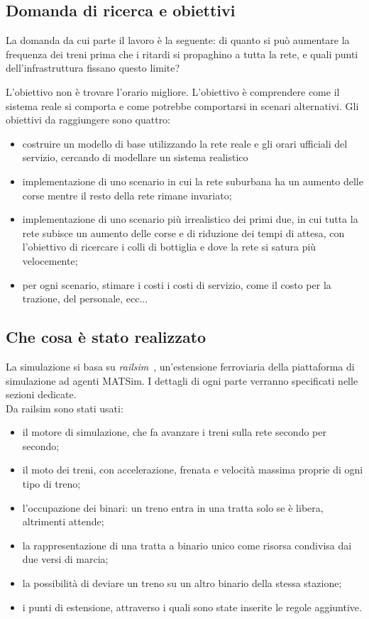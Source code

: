 \subsection{Domanda di ricerca e obiettivi}
La domanda da cui parte il lavoro è la seguente: di quanto si può aumentare la frequenza dei treni prima che i ritardi si propaghino a tutta la rete, e quali punti dell'infrastruttura fissano questo limite?

L'obiettivo non è trovare l'orario migliore.
L'obiettivo è comprendere come il sistema reale si comporta e come potrebbe comportarsi in scenari alternativi.
Gli obiettivi da raggiungere sono quattro:
\begin{itemize}
	\item costruire un modello di base utilizzando la rete reale e gli orari ufficiali del servizio, cercando di modellare un sistema realistico
	\item implementazione di uno scenario in cui la rete suburbana ha un aumento delle corse mentre il resto della rete rimane invariato;
	\item implementazione di uno scenario più irrealistico dei primi due, in cui tutta la rete subisce un aumento delle corse e di riduzione dei tempi di attesa, con l'obiettivo di ricercare i colli di bottiglia e dove la rete si satura più velocemente;
	\item per ogni scenario, stimare i costi i costi di servizio, come il costo per la trazione, del personale, ecc...
\end{itemize}

\subsection{Che cosa è stato realizzato}

La simulazione si basa su \textit{railsim}~\cite{kaddoura2024railsim}, un'estensione ferroviaria della piattaforma di simulazione ad agenti MATSim. I dettagli di ogni parte verranno specificati nelle sezioni dedicate.\\

Da railsim sono stati usati:
\begin{itemize}
	\item il motore di simulazione, che fa avanzare i treni sulla rete secondo per secondo;
	\item il moto dei treni, con accelerazione, frenata e velocità massima proprie di ogni tipo di treno;
	\item l'occupazione dei binari: un treno entra in una tratta solo se è libera, altrimenti attende;
	\item la rappresentazione di una tratta a binario unico come risorsa condivisa dai due versi di marcia;
	\item la possibilità di deviare un treno su un altro binario della stessa stazione;
	\item i punti di estensione, attraverso i quali sono state inserite le regole aggiuntive.
\end{itemize}

